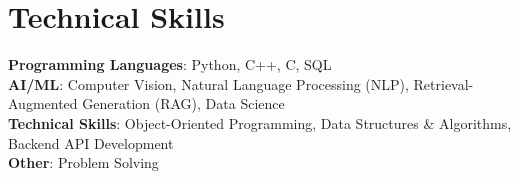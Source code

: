 \documentclass[letterpaper,11pt]{article}
\begin{document}
\section{Technical Skills}
 \begin{itemize}[leftmargin=0.15in, label={}]
    \small{\item{
           \textbf{Programming Languages}{: Python, C++, C, SQL} \\
           \textbf{AI/ML}{: Computer Vision, Natural Language Processing (NLP), Retrieval-Augmented Generation (RAG), Data Science} \\
           \textbf{Technical Skills}{: Object-Oriented Programming, Data Structures \& Algorithms, Backend API Development} \\
           \textbf{Other}{: Problem Solving} \\
         }}
 \end{itemize}
\end{document}
